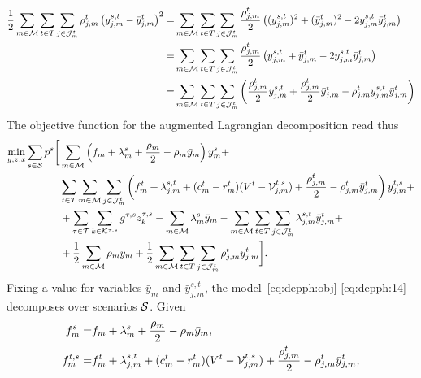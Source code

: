 \documentclass[a4paper,11pt]{article}
\begin{document}
	\begin{equation}
	\begin{split}
		\frac{1}{2} \sum\limits_{m \in {\cal M}} \sum\limits_{t \in T} \sum\limits_{j \in {\cal J}_{m}^t} \rho^{t}_{j,m} \left( y^{s,t}_{j,m} - \bar{y}^t_{j,m} \right)^2
		= & \sum\limits_{m \in {\cal M}} \sum\limits_{t \in T} \sum\limits_{j \in {\cal J}_{m}^t} \frac{\rho^{t}_{j,m}}{2} \left( (y^{s,t}_{j,m})^2 + (\bar{y}^t_{j,m})^2 - 2 y^{s,t}_{j,m} \bar{y}^t_{j,m} \right) \\
		= & \sum\limits_{m \in {\cal M}} \sum\limits_{t \in T} \sum\limits_{j \in {\cal J}_{m}^t} \frac{\rho^{t}_{j,m}}{2} \left( y^{s,t}_{j,m} + \bar{y}^t_{j,m} - 2 y^{s,t}_{j,m} \bar{y}^t_{j,m} \right) \\
		= & \sum\limits_{m \in {\cal M}} \sum\limits_{t \in T} \sum\limits_{j \in {\cal J}_{m}^t} \left( \frac{\rho^{t}_{j,m}}{2} y^{s,t}_{j,m} + \frac{\rho^{t}_{j,m}}{2} \bar{y}^t_{j,m} - \rho^{t}_{j,m} y^{s,t}_{j,m} \bar{y}^t_{j,m} \right)
	\end{split}
	\end{equation}
	The objective function for the augmented Lagrangian decomposition read thus
	\begin{equation}
	\begin{split}
		\min_{y,z,x} 
		\sum_{s \in \cal S} p^{s} \biggl[ 
		& \sum_{m \in \cal M} \left(f_{m} + \lambda^s_m + \frac{\rho_m}{2} -\rho_m \bar{y}_m \right) y^s_{m} + \\
		& \sum_{t \in T} \sum_{m \in {{\cal M}}} \sum_{j \in {\cal J}_{m}^t} \left(f_{m}^t + \lambda^{s,t}_{j,m} + (c_{m}^t-r_{m}^t)(V^{t} - {\cal V}_{j,m}^{t,s}) + \frac{\rho^{t}_{j,m}}{2} - \rho^{t}_{j,m} \bar{y}^t_{j,m} \right) y^{t,s}_{j,m} + \\
		& + \sum_{\tau \in \cal T} \sum_{k \in {\cal K}^{\tau,s}} g^{\tau,s} z_k^{\tau,s} - \sum\limits_{m \in {\cal M}} \lambda^s_m \bar{y}_m - \sum\limits_{m \in {\cal M}} \sum\limits_{t \in T} \sum\limits_{j \in {\cal J}_{m}^t} \lambda^{s,t}_{j,m} \bar{y}^t_{j,m} + \\
		& + \frac{1}{2} \sum\limits_{m \in {\cal M}} \rho_m \bar{y}_m + \frac{1}{2} \sum\limits_{m \in {\cal M}} \sum\limits_{t \in T} \sum\limits_{j \in {\cal J}_{m}^t} \rho^{t}_{j,m} \bar{y}^t_{j,m} \biggr]. \label{eq:depphlg:objbis}
	\end{split}
	\end{equation}
	Fixing a value for variables $ \bar{y}_m $ and $ \bar{y}^{s,t}_{j,m}$, the model~\eqref{eq:depph:obj}-\eqref{eq:depph:14} decomposes over scenarios $ \cal S$.
	Given
	\begin{alignat}{2}
		\bar{f}^s_{m} = & f_{m} + \lambda^s_m + \frac{\rho_m}{2} -\rho_m \bar{y}_m, \\
		\bar{f}^{t,s}_{m} = & f_{m}^t + \lambda^{s,t}_{j,m} + (c_{m}^t-r_{m}^t)(V^{t} - {\cal V}_{j,m}^{t,s}) + \frac{\rho^{t}_{j,m}}{2} - \rho^{t}_{j,m} \bar{y}^t_{j,m},
	\end{alignat}
\end{document}
